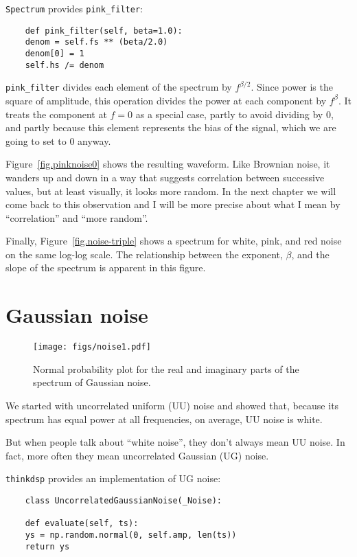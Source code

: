 {\tt Spectrum} provides \verb"pink_filter":

\begin{verbatim}
	def pink_filter(self, beta=1.0):
	denom = self.fs ** (beta/2.0)
	denom[0] = 1
	self.hs /= denom
\end{verbatim}

\verb"pink_filter" divides each element of the spectrum by
$f^{\beta/2}$.  Since power is the square of amplitude, this
operation divides the power at
each component by $f^\beta$.  It treats the component
at $f=0$ as a special case, partly to avoid dividing by 0, and partly
because this element represents the bias of the signal,
which we are going to set to 0 anyway.

Figure~\ref{fig.pinknoise0} shows the resulting waveform.  Like
Brownian noise, it wanders up and down in a way that suggests
correlation between successive values, but at least visually, it looks
more random.  In the next chapter we will come back to this
observation and I will be more precise about what I mean by
``correlation'' and ``more random''.

Finally, Figure~\ref{fig.noise-triple} shows a spectrum for
white, pink, and red noise on the same log-log scale.
The relationship between the exponent, $\beta$, and the slope
of the spectrum is apparent in this figure.


\section{Gaussian noise}

\begin{figure}
	\centerline{\texttt{[image: figs/noise1.pdf]}}
	\caption{Normal probability plot for the real and imaginary parts
		of the spectrum of Gaussian noise.}
	\label{fig.noise1}
\end{figure}

We started with uncorrelated uniform (UU) noise and showed that,
because its spectrum has equal power at all frequencies, on
average, UU noise is white.

But when people talk about ``white noise'', they don't always
mean UU noise.  In fact, more often they mean uncorrelated
Gaussian (UG) noise.

{\tt thinkdsp} provides an implementation of UG noise:

\begin{verbatim}
	class UncorrelatedGaussianNoise(_Noise):
	
	def evaluate(self, ts):
	ys = np.random.normal(0, self.amp, len(ts))
	return ys
\end{verbatim}

